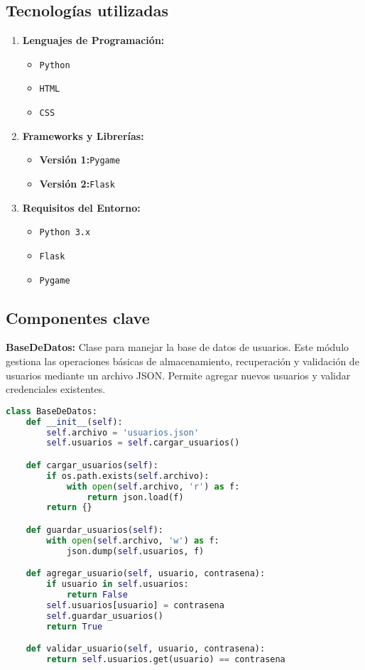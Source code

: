 \documentclass[a4paper,12pt]{article}
\begin{document}
\subsection{Tecnologías utilizadas}
\begin{enumerate}
    \item \textbf{Lenguajes de Programación:}
    \begin{itemize}
            \item \texttt{Python} 
            \item \texttt{HTML}
            \item \texttt{CSS}
        \end{itemize}
    \item \textbf{Frameworks y Librerías:}
    \begin{itemize}
        \item \textbf{Versión 1:}\texttt{Pygame}
        \item \textbf{Versión 2:}\texttt{Flask}
    \end{itemize}
    \item \textbf{Requisitos del Entorno:}
    \begin{itemize}
        \item \texttt{Python 3.x}
        \item \texttt{Flask}
        \item \texttt{Pygame}
    \end{itemize}
\end{enumerate}

\subsection{Componentes clave}

\textbf{BaseDeDatos:} Clase para manejar la base de datos de usuarios. Este módulo gestiona las operaciones básicas de almacenamiento, recuperación y validación de usuarios mediante un archivo JSON. Permite agregar nuevos usuarios y validar credenciales existentes.

\begin{lstlisting}[language=Python, caption={Clase BaseDeDatos}]
class BaseDeDatos:
    def __init__(self):
        self.archivo = 'usuarios.json'
        self.usuarios = self.cargar_usuarios()

    def cargar_usuarios(self):
        if os.path.exists(self.archivo):
            with open(self.archivo, 'r') as f:
                return json.load(f)
        return {}

    def guardar_usuarios(self):
        with open(self.archivo, 'w') as f:
            json.dump(self.usuarios, f)

    def agregar_usuario(self, usuario, contrasena):
        if usuario in self.usuarios:
            return False
        self.usuarios[usuario] = contrasena
        self.guardar_usuarios()
        return True

    def validar_usuario(self, usuario, contrasena):
        return self.usuarios.get(usuario) == contrasena
\end{lstlisting}
\end{document}
